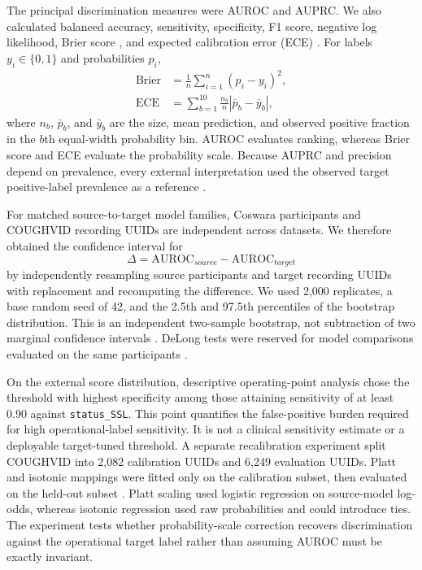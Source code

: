 \documentclass[journal]{IEEEtran}
\newcommand{\auroc}{\mathrm{AUROC}}
\newcommand{\brier}{\mathrm{Brier}}
\newcommand{\ece}{\mathrm{ECE}}
\begin{document}
The principal discrimination measures were AUROC and AUPRC. We also calculated balanced accuracy, sensitivity, specificity, F1 score, negative log likelihood, Brier score \cite{brier1950verification}, and expected calibration error (ECE) \cite{vancalster2019calibration}. For labels $y_i\in\{0,1\}$ and probabilities $p_i$,
\begin{equation}
\begin{split}
    \brier&=\frac{1}{n}\sum_{i=1}^{n}(p_i-y_i)^2,\\
    \ece&=\sum_{b=1}^{10}\frac{n_b}{n}\left|\bar{p}_b-\bar{y}_b\right|,
\end{split}
\end{equation}
where $n_b$, $\bar{p}_b$, and $\bar{y}_b$ are the size, mean prediction, and observed positive fraction in the $b$th equal-width probability bin. AUROC evaluates ranking, whereas Brier score and ECE evaluate the probability scale. Because AUPRC and precision depend on prevalence, every external interpretation used the observed target positive-label prevalence as a reference \cite{saito2015auprc}.

For matched source-to-target model families, Coswara participants and COUGHVID recording UUIDs are independent across datasets. We therefore obtained the confidence interval for
\begin{equation}
    \Delta=\auroc_{source}-\auroc_{target}
\end{equation}
by independently resampling source participants and target recording UUIDs with replacement and recomputing the difference. We used 2,000 replicates, a base random seed of 42, and the 2.5th and 97.5th percentiles of the bootstrap distribution. This is an independent two-sample bootstrap, not subtraction of two marginal confidence intervals \cite{carpenter2000bootstrap}. DeLong tests were reserved for model comparisons evaluated on the same participants \cite{delong1988roc}.

On the external score distribution, descriptive operating-point analysis chose the threshold with highest specificity among those attaining sensitivity of at least 0.90 against \texttt{status\_SSL}. This point quantifies the false-positive burden required for high operational-label sensitivity. It is not a clinical sensitivity estimate or a deployable target-tuned threshold. A separate recalibration experiment split COUGHVID into 2,082 calibration UUIDs and 6,249 evaluation UUIDs. Platt and isotonic mappings were fitted only on the calibration subset, then evaluated on the held-out subset \cite{platt1999probabilistic,niculescu2005calibration}. Platt scaling used logistic regression on source-model log-odds, whereas isotonic regression used raw probabilities and could introduce ties. The experiment tests whether probability-scale correction recovers discrimination against the operational target label rather than assuming AUROC must be exactly invariant.
\end{document}
